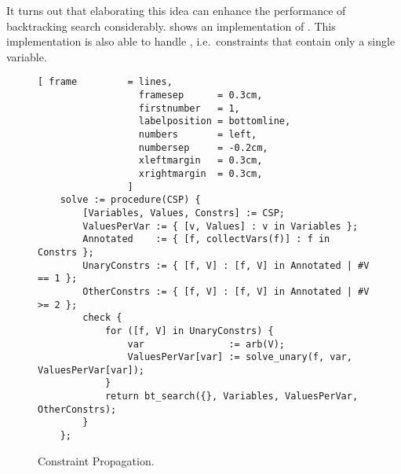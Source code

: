 It turns out that elaborating this idea can enhance the performance of backtracking search considerably.
 shows an implementation of .
This implementation is also able to handle , i.e.~constraints that contain
only a single variable.

\begin{figure}[!ht]
\centering
\begin{Verbatim}[ frame         = lines, 
                  framesep      = 0.3cm, 
                  firstnumber   = 1,
                  labelposition = bottomline,
                  numbers       = left,
                  numbersep     = -0.2cm,
                  xleftmargin   = 0.3cm,
                  xrightmargin  = 0.3cm,
                ]
    solve := procedure(CSP) {
        [Variables, Values, Constrs] := CSP;
        ValuesPerVar := { [v, Values] : v in Variables };
        Annotated    := { [f, collectVars(f)] : f in Constrs };
        UnaryConstrs := { [f, V] : [f, V] in Annotated | #V == 1 };
        OtherConstrs := { [f, V] : [f, V] in Annotated | #V >= 2 };
        check {
            for ([f, V] in UnaryConstrs) {
                var               := arb(V);
                ValuesPerVar[var] := solve_unary(f, var, ValuesPerVar[var]);
            }
            return bt_search({}, Variables, ValuesPerVar, OtherConstrs);
        }
    };
\end{Verbatim}
\vspace*{-0.3cm}
\caption{Constraint Propagation.}
\label{fig:csp-constraint-propagation.stlx-1}
\end{figure}

